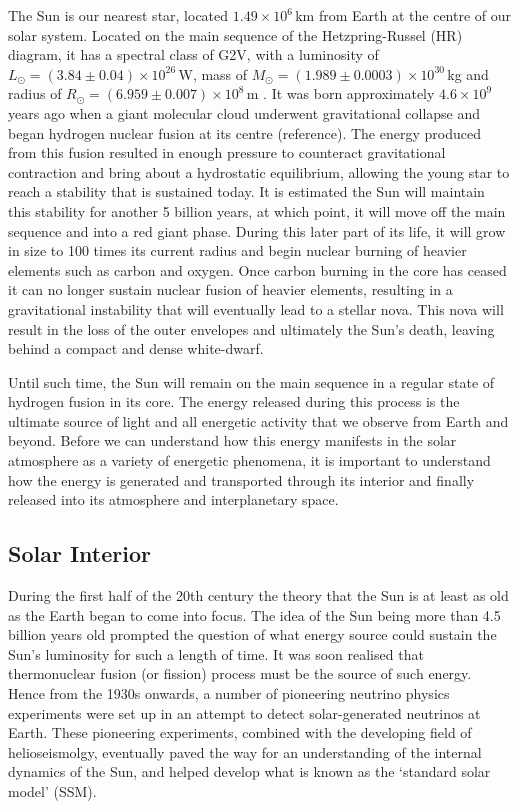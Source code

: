 The Sun is our nearest star, located $1.49\times10^6$\,km from Earth at the centre of our solar system. Located on the main sequence of the Hetzpring-Russel (HR) diagram, it has a spectral class of G2V, with a luminosity of $L_{\odot}=(3.84\pm 0.04)\times10^{26}$\,W, mass of $M_{\odot}=(1.989\pm0.0003)\times10^{30}$\,kg and radius of $R_{\odot}=(6.959\pm0.007)\times10^8$\,m \citep{foukal2004}. It was born approximately $4.6 \times 10^9$\,years ago when a giant molecular cloud underwent gravitational collapse and began hydrogen nuclear fusion at its centre (reference). The energy produced from this fusion resulted in enough pressure to counteract gravitational contraction and bring about a hydrostatic equilibrium, allowing the young star to reach a stability that is sustained today. It is estimated the Sun will maintain this stability for another 5 billion years, at which point, it will move off the main sequence and into a red giant phase. During this later part of its life, it will grow in size to 100 times its current radius and begin nuclear burning of heavier elements such as carbon and oxygen. Once carbon burning in the core has ceased it can no longer sustain nuclear fusion of heavier elements, resulting in a gravitational instability that will eventually lead to a stellar nova. This nova will result in the loss of the outer envelopes and ultimately the Sun's death, leaving behind a compact and dense white-dwarf.

Until such time, the Sun will remain on the main sequence in a regular state of hydrogen fusion in its core. The energy released during this process is the ultimate source of light and all energetic activity that we observe from Earth and beyond. Before we can understand how this energy manifests in the solar atmosphere as a variety of energetic phenomena, it is important to understand how the energy is generated and transported through its interior and finally released into its atmosphere and interplanetary space.

\subsection{Solar Interior}\label{sec:10}

During the first half of the 20th century the theory that the Sun is at least as old as the Earth began to come into focus. The idea of the Sun being more than 4.5 billion years old prompted the question of what energy source could sustain the Sun's luminosity for such a length of time. It was soon realised that thermonuclear fusion (or fission) process must be the source of such energy. Hence from the 1930s onwards, a number of pioneering neutrino physics experiments were set up in an attempt to detect solar-generated neutrinos at Earth. These pioneering experiments, combined with the developing field of helioseismolgy, eventually paved the way for an understanding of the internal dynamics of the Sun, and helped develop what is known as the \textquoteleft standard solar model' (SSM). 

